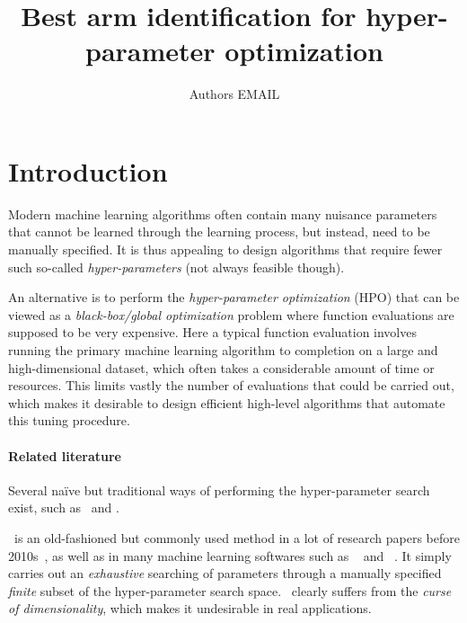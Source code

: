 \documentclass[twoside,11pt]{article}
\begin{document}
\title{\large Best arm identification for hyper-parameter optimization}

\author{\name Authors \email EMAIL}


\maketitle


\begin{abstract}
	
\end{abstract}


\section{Introduction}

Modern machine learning algorithms often contain many nuisance parameters that cannot be learned through the learning process, but instead, need to be manually specified. It is thus appealing to design algorithms that require fewer such so-called \emph{hyper-parameters} (not always feasible though).

An alternative is to perform the \emph{hyper-parameter optimization} (HPO) that can be viewed as a \emph{black-box/global optimization} problem where function evaluations are supposed to be very expensive. Here a typical function evaluation involves running the primary machine learning algorithm to completion on a large and high-dimensional dataset, which often takes a considerable amount of time or resources. This limits vastly the number of evaluations that could be carried out, which makes it desirable to design efficient high-level algorithms that automate this tuning procedure.

\paragraph{Related literature}

Several naïve but traditional ways of performing the hyper-parameter search exist, such as \Grid\ and \Random.

\Grid\ is an old-fashioned but commonly used method in a lot of research papers before 2010s~\citep{lecun1998gradient}, as well as in many machine learning softwares such as \LIBSVM~\citep{chang2011libsvm} and \Scikit~\citep{pedregosa2011sklearn}. It simply carries out an \emph{exhaustive} searching of parameters through a manually specified \emph{finite} subset of the hyper-parameter search space. \Grid\ clearly suffers from the \emph{curse of dimensionality}, which makes it undesirable in real applications.
\end{document}
